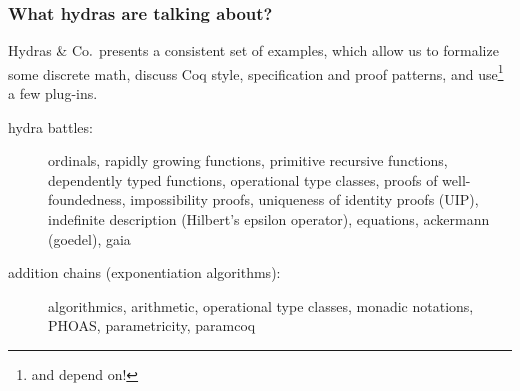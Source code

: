 \documentclass[10pt]{beamer}
\newcommand{\coq}{Coq\xspace}
\newcommand{\Hydras}{Hydras \& Co$\text.$\xspace}
\begin{document}


\begin{frame}
  \frametitle{What hydras are talking about?}
  \begin{block}{}
    \Hydras presents a consistent set of examples, which allow us to formalize 
    some \textcolor{mathcolor}{discrete math}, discuss
    \textcolor{coqstylecolor}{\coq style, specification and proof patterns}, and use\footnote{and depend on!} \textcolor{plugincolor}{a few plug-ins}.
  \end{block}
  \begin{block}{}
    \begin{description}
    \item[hydra battles:]
    
  \textcolor{mathcolor}{ordinals},
    \textcolor{mathcolor}{rapidly growing functions},
    \textcolor{mathcolor}{primitive recursive functions}, 
   \textcolor{coqstylecolor}{dependently typed functions},
    \textcolor{coqstylecolor}{operational type classes},
      \textcolor{coqstylecolor}{proofs of well-foundedness},
         \textcolor{coqstylecolor}{impossibility proofs},
    \textcolor{coqstylecolor}{uniqueness of identity proofs (UIP)},
      \textcolor{coqstylecolor}{indefinite description (Hilbert's epsilon operator)}, 
     \textcolor{plugincolor}{equations},
    \textcolor{plugincolor}{ackermann (goedel)},
      \textcolor{plugincolor}{gaia}
   
 \item[addition chains (exponentiation algorithms):]
      \textcolor{mathcolor}{algorithmics},
       \textcolor{mathcolor}{arithmetic},
            \textcolor{coqstylecolor}{operational type classes},
    \textcolor{coqstylecolor}{monadic notations},
    \textcolor{coqstylecolor}{PHOAS},
  \textcolor{coqstylecolor}{parametricity}, 
        \textcolor{plugincolor}{paramcoq}
        \end{description}
  \end{block}
\end{frame}
\end{document}
